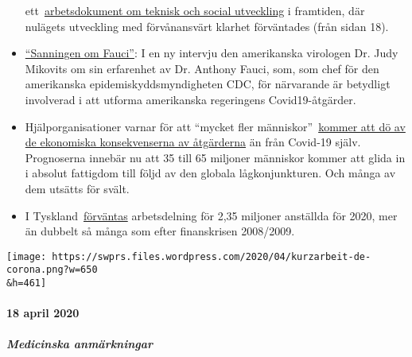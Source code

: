 \begin{itemize}
  ett~\href{https://swprs.files.wordpress.com/2020/04/rockefeller-foundation-scenarios-2010.pdf}{arbetsdokument
  om teknisk och social utveckling} i framtiden, där nulägets utveckling
  med förvånansvärt klarhet förväntades (från sidan 18).
\item
  \href{https://childrenshealthdefense.org/news/the-truth-about-fauci-featuring-dr-judy-mikovits/}{``Sanningen
  om Fauci''}: I en ny intervju den amerikanska virologen Dr. Judy
  Mikovits om sin erfarenhet av Dr. Anthony Fauci, som, som chef för den
  amerikanska epidemiskyddsmyndigheten CDC, för närvarande är betydligt
  involverad i att utforma amerikanska regeringens Covid19-åtgärder.
\item
  Hjälporganisationer varnar för att ``mycket fler
  människor''~\href{https://www.welt.de/wirtschaft/article207092745/Corona-Pandemie-Rezession-beschert-der-Welt-die-noch-groessere-Katastrophe.html}{kommer
  att dö av de ekonomiska konsekvenserna av åtgärderna} än från Covid-19
  själv. Prognoserna innebär nu att 35 till 65 miljoner människor kommer
  att glida in i absolut fattigdom till följd av den globala
  lågkonjunkturen. Och många av dem utsätts för svält.
\item
  I
  Tyskland~\href{https://www.boeckler.de/pdf/p_wsi_pb_38_2020.pdf}{förväntas}
  arbetsdelning för 2,35 miljoner anställda för 2020, mer än dubbelt så
  många som efter finanskrisen 2008/2009.
\end{itemize}

\texttt{[image: https://swprs.files.wordpress.com/2020/04/kurzarbeit-de-corona.png?w=650\\\&h=461]}

\hypertarget{18-april-2020}{%
\paragraph{18 april 2020}\label{18-april-2020}}

\hypertarget{medicinska-anmuxe4rkningar}{%
\subparagraph{\texorpdfstring{\textbf{Medicinska
anmärkningar}}{Medicinska anmärkningar}}\label{medicinska-anmuxe4rkningar}}

